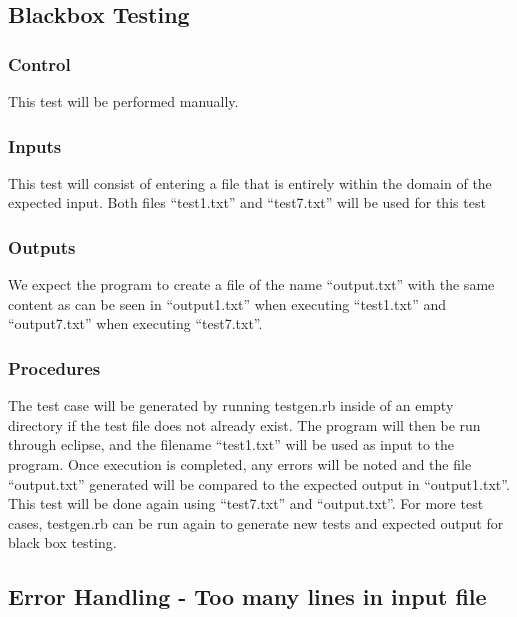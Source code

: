 \documentclass[]{article}
\begin{document}

\subsection{Blackbox Testing}
	\subsubsection{Control}
	This test will be performed manually.
	
	\subsubsection{Inputs}
	This test will consist of entering a file that is entirely within the domain of
	the expected input.  Both files ``test1.txt'' and ``test7.txt'' will be used
	for this test
	
	\subsubsection{Outputs}
	We expect the program to create a file of the name ``output.txt'' with the same
	content as can be seen in ``output1.txt'' when executing ``test1.txt'' and
	``output7.txt'' when executing ``test7.txt''.
	
	\subsubsection{Procedures}
	The test case will be generated by running testgen.rb inside of an empty
	directory if the test file does not already exist.  The program will then be
	run through eclipse, and the filename ``test1.txt'' will be used as input to
	the program.  Once execution is completed, any errors will be noted and the
	file ``output.txt'' generated will be compared to the expected output in
	``output1.txt''.  This test will be done again using ``test7.txt'' and
	``output.txt''.  For more test cases, testgen.rb can be run again to generate
	new tests and expected output for black box testing.
	

\subsection{Error Handling - Too many lines in input file}
\end{document}
